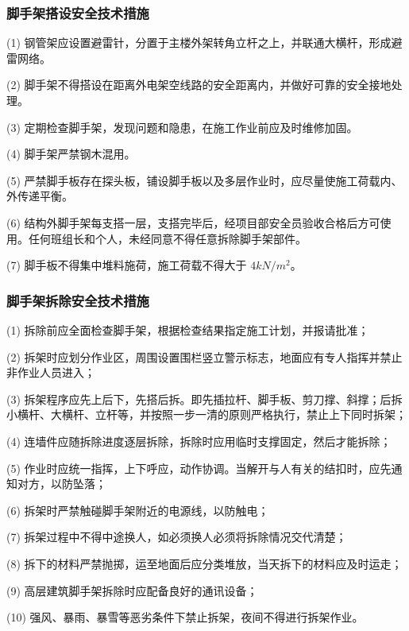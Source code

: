 \subsubsection{脚手架搭设安全技术措施}

(1) 钢管架应设置避雷针，分置于主楼外架转角立杆之上，并联通大横杆，形成避雷网络。

(2) 脚手架不得搭设在距离外电架空线路的安全距离内，并做好可靠的安全接地处理。

(3) 定期检查脚手架，发现问题和隐患，在施工作业前应及时维修加固。

(4) 脚手架严禁钢木混用。

(5) 严禁脚手板存在探头板，铺设脚手板以及多层作业时，应尽量使施工荷载内、外传递平衡。

(6) 结构外脚手架每支搭一层，支搭完毕后，经项目部安全员验收合格后方可使用。任何班组长和个人，未经同意不得任意拆除脚手架部件。

(7) 脚手板不得集中堆料施荷，施工荷载不得大于 $4kN/m^2$。

\subsubsection{脚手架拆除安全技术措施}

(1) 拆除前应全面检查脚手架，根据检查结果指定施工计划，并报请批准；

(2) 拆架时应划分作业区，周围设置围栏竖立警示标志，地面应有专人指挥并禁止非作业人员进入；

(3) 拆架程序应先上后下，先搭后拆。即先插拉杆、脚手板、剪刀撑、斜撑；后拆小横杆、大横杆、立杆等，并按照一步一清的原则严格执行，禁止上下同时拆架；

(4) 连墙件应随拆除进度逐层拆除，拆除时应用临时支撑固定，然后才能拆除；

(5) 作业时应统一指挥，上下呼应，动作协调。当解开与人有关的结扣时，应先通知对方，以防坠落；

(6) 拆架时严禁触碰脚手架附近的电源线，以防触电；

(7) 拆架过程中不得中途换人，如必须换人必须将拆除情况交代清楚；

(8) 拆下的材料严禁抛掷，运至地面后应分类堆放，当天拆下的材料应及时运走；

(9) 高层建筑脚手架拆除时应配备良好的通讯设备；

(10) 强风、暴雨、暴雪等恶劣条件下禁止拆架，夜间不得进行拆架作业。